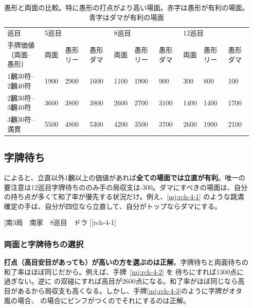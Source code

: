 \documentclass[../nankiru_main.tex]{subfiles}
\begin{document}
\begin{table}[t]
  \centering
  \begin{tabular}{l|lllllllll}
    巡目       & \multicolumn{3}{l}{5巡目} & \multicolumn{3}{l}{8巡目} & \multicolumn{3}{l}{12巡目} \\
    手牌価値（両面--愚形）& 両面 & 愚形リー & 愚形ダマ & 両面 & 愚形リー & 愚形ダマ & 両面 & 愚形リー & 愚形ダマ \\
    \hline
    1飜30符--2飜40符    & {\color{red}1900} & {\color{red}2900} & {\color{red}1600} & {\color{red}1100} & {\color{red}1900} & {\color{red}900} & {\color{red}300} & {\color{red}800} & {\color{red}100} \\
    2飜30符--3飜40符    & 3600 & 3800 & 3800 & {\color{blue}2600} & {\color{blue}2700} & {\color{blue}3100} & {\color{blue}1400} & {\color{blue}1400} & {\color{blue}1700} \\
    3飜30符--満貫       & 5500 & 4800 & 5300 & 4200 & 3500 & 3700 & 2600 & 1900 & 2100 \\
  \end{tabular}
  \caption{愚形と両面の比較。特に愚形の打点がより高い場面。赤字は愚形が有利の場面。青字はダマが有利の場面}
  \label{tab:ev-ryanmen-gukei-compare}
\end{table}


\subsection{字牌待ち}

\citet[p. 46]{miinin-stat}によると、立直以外1飜以上の価値があれば\textbf{全ての場面では立直が有利}。唯一の要注意は12巡目字牌待ちののみ手の局収支は-300。ダマにすべきの場面は、自分の持ち点が多くて和了率が優先する状況だけ。例え、\ref{mj:rch-4-1} のような跳満確定の手は、自分が四位なら立直して、自分がトップならダマにする。

[南3局　南家　8巡目　ドラ ][rch-4-1]


\subsubsection*{両面と字牌待ちの選択} 

\textbf{打点（高目安目があっても）が高いの方を選ぶのは正解}\citep[][p.50]{miinin-stat}。字牌待ちと両面待ちの和了率はほぼ同じだから。例えば、手牌~\ref{mj:rch-4-2} を  待ちにすれば1300点に過ぎない。逆に  の双碰にすれば高目が2600点になる。和了率がほぼ同じなら高目があるから局収支も高くなる。しかし、手牌\ref{mj:rch-4-3}のように字牌がオタ風の場合、 の場合にピンフがつくのでそれにするのは正解。
\end{document}

